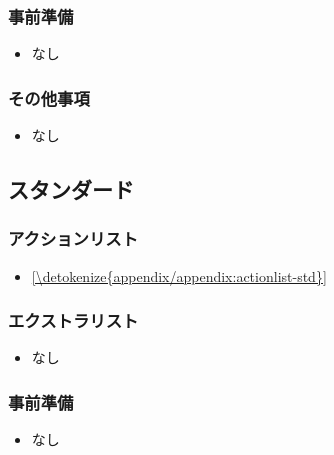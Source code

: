 \documentclass[letterpaper,10pt,dvipdfmx]{sphinxmanual}
\begin{document}
\subsubsection{事前準備}
\label{\detokenize{format/lite:id4}}\begin{itemize}
\item {} 
\sphinxAtStartPar
なし

\end{itemize}


\subsubsection{その他事項}
\label{\detokenize{format/lite:id5}}\begin{itemize}
\item {} 
\sphinxAtStartPar
なし

\end{itemize}

\sphinxstepscope


\subsection{スタンダード}
\label{\detokenize{format/standard:format-standard}}\label{\detokenize{format/standard:id1}}\label{\detokenize{format/standard::doc}}

\subsubsection{アクションリスト}
\label{\detokenize{format/standard:id2}}\begin{itemize}
\item {} 
\sphinxAtStartPar
\hyperref[\detokenize{appendix/appendix:actionlist-std}]{\ref{\detokenize{appendix/appendix:actionlist-std}} }

\end{itemize}


\subsubsection{エクストラリスト}
\label{\detokenize{format/standard:id3}}\begin{itemize}
\item {} 
\sphinxAtStartPar
なし

\end{itemize}


\subsubsection{事前準備}
\label{\detokenize{format/standard:id4}}\begin{itemize}
\item {} 
\sphinxAtStartPar
なし

\end{itemize}
\end{document}
